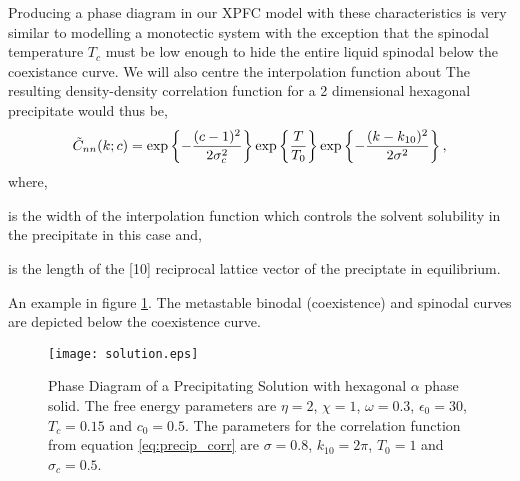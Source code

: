 
Producing a phase diagram in our XPFC model with these characteristics is very similar to
modelling a monotectic system with the exception that the spinodal temperature
$T_c$ must be low enough to hide the entire liquid spinodal below the
coexistance curve.  We will also centre the interpolation function  
about  
The resulting density-density correlation function for a 2 dimensional hexagonal 
precipitate would thus be,
%
\begin{equation}
    \label{eq:precip_corr}
    \tilde{C}_{nn}(k; c) = \exp\left\lbrace - \frac{(c - 1)^2}{2\sigma_c^2}\right\rbrace
        \exp\left\lbrace \frac{T}{T_0} \right\rbrace 
        \exp\left\lbrace - \frac{(k - k_{10})^2}{2\sigma^2} \right\rbrace,
\end{equation}
%
where,
\begin{description}[labelwidth=1cm, align=right]
    \item[$\sigma_c$] is the width of the interpolation function 
        which controls the solvent solubility in the precipitate in this case
        and,
    \item[$k_{10}$] is the length of the [10] reciprocal lattice vector of the
        preciptate in equilibrium.
\end{description}

An example  in figure \ref{fig:precip_phase_dia}. The metastable binodal (coexistence) and spinodal
curves are depicted below the coexistence curve.

\begin{figure}
    \centering	
    \texttt{[image: solution.eps]}
    \caption[Coexistance Phase Diagram with Metastable Spinodal]{
        \label{fig:precip_phase_dia} Phase Diagram of a Precipitating Solution
        with hexagonal $\alpha$ phase  solid.  The free energy parameters are $\eta =
        2$, $\chi = 1$, $\omega=0.3$, $\epsilon_0=30$, $T_c = 0.15$ and
        $c_0=0.5$. The parameters for the correlation function from equation
        \ref{eq:precip_corr} are $\sigma = 0.8$, $k_{10} = 2\pi$, $T_0 = 1$
        and $\sigma_c = 0.5$.
    }
\end{figure}

